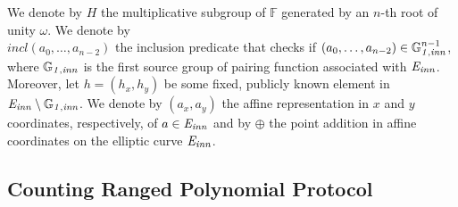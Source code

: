 \vspace{-0.009in}
\noindent We denote by $H$ the multiplicative subgroup of $\mathbb{F}$ generated 
by an $n$-th root of unity $\omega$. We denote by \\ $\mathit{incl}(a_0, \ldots, a_{n-2})$ the inclusion 
predicate that checks if $(a_0, \ldots, a_{n-2}) \in \mathbb{G}_{\mathit{1,inn}}^{n-1}$, where $\mathbb{G}_{\mathit{1,inn}}$ is the first source group 
of pairing function associated with $\mathit{E}_{\mathit{inn}}$. Moreover, let $h = (\mathit{h_x}, \mathit{h_y})$ be some fixed, 
publicly known element in $\mathit{E}_{\mathit{inn}} \setminus \mathbb{G}_{\mathit{1,inn}}$. We denote by $(a_x, a_y)$ the affine representation in 
$x$ and $y$ coordinates, respectively, of $a \in \mathit{E}_{\mathit{inn}}$ and by $\oplus$ the point addition in affine coordinates on the 
elliptic curve $\mathit{E}_{\mathit{inn}}$. \\
\vspace{-0.15in}

\subsection{Counting Ranged Polynomial Protocol}
\label{sec_vt}

